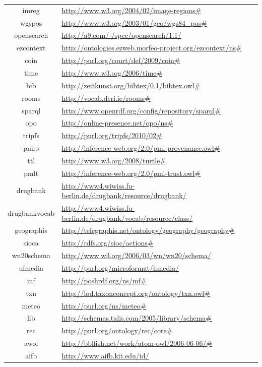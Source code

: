 \documentclass{article}
\begin{document}
\begin{longtable}{ c | p{8cm} }
imreg & \url{http://www.w3.org/2004/02/image-regions#} \\
wgspos & \url{http://www.w3.org/2003/01/geo/wgs84_pos#} \\
opensearch & \url{http://a9.com/-/spec/opensearch/1.1/} \\
ezcontext & \url{http://ontologies.ezweb.morfeo-project.org/ezcontext/ns#} \\
coin & \url{http://purl.org/court/def/2009/coin#} \\
time & \url{http://www.w3.org/2006/time#} \\
bib & \url{http://zeitkunst.org/bibtex/0.1/bibtex.owl#} \\
rooms & \url{http://vocab.deri.ie/rooms#} \\
sparql & \url{http://www.openrdf.org/config/repository/sparql#} \\
opo & \url{http://online-presence.net/opo/ns#} \\
tripfs & \url{http://purl.org/tripfs/2010/02#} \\
pmlp & \url{http://inference-web.org/2.0/pml-provenance.owl#} \\
ttl & \url{http://www.w3.org/2008/turtle#} \\
pmlt & \url{http://inference-web.org/2.0/pml-trust.owl#} \\
drugbank & \url{http://www4.wiwiss.fu-berlin.de/drugbank/resource/drugbank/} \\
drugbankvocab & \url{http://www4.wiwiss.fu-berlin.de/drugbank/vocab/resource/class/} \\
geographis & \url{http://telegraphis.net/ontology/geography/geography#} \\
sioca & \url{http://rdfs.org/sioc/actions#} \\
wn20schema & \url{http://www.w3.org/2006/03/wn/wn20/schema/} \\
ufmedia & \url{http://purl.org/microformat/hmedia/} \\
mf & \url{http://poshrdf.org/ns/mf#} \\
txn & \url{http://lod.taxonconcept.org/ontology/txn.owl#} \\
meteo & \url{http://purl.org/ns/meteo#} \\
lib & \url{http://schemas.talis.com/2005/library/schema#} \\
rec & \url{http://purl.org/ontology/rec/core#} \\
awol & \url{http://bblfish.net/work/atom-owl/2006-06-06/#} \\
aifb & \url{http://www.aifb.kit.edu/id/} \\

\end{longtable}
\end{document}
